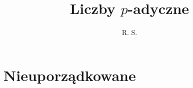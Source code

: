 \documentclass[a4paper, fleqn]{extreport}
\author{R. S.}
\title{Liczby $p$-adyczne}
\numberwithin{dummy}{section}
\begin{document}
\maketitle
\tableofcontents

\chapter{Nieuporządkowane}








\end{document}
